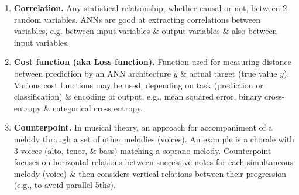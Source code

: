 \documentclass{article}
\begin{document}
\begin{itemize}
\begin{enumerate}
		\item {\bf Correlation.} Any statistical relationship, whether causal or not, between 2 random variables. ANNs are good at extracting correlations between variables, e.g. between input variables \& output variables \& also between input variables.
		\item {\bf Cost function (aka Loss function).} Function used for measuring distance between prediction by an ANN architecture $\hat{y}$ \& actual target (true value $y$). Various cost functions may be used, depending on task (prediction or classification) \& encoding of output, e.g., mean squared error, binary cross-entropy \& categorical cross entropy.
		\item {\bf Counterpoint.} In musical theory, an approach for accompaniment of a melody through a set of other melodies (voices). An example is a chorale with 3 voices (alto, tenor, \& bass) matching a soprano melody. Counterpoint focuses on horizontal relations between successive notes for each simultaneous melody (voice) \& then considers vertical relations between their progression (e.g., to avoid parallel 5ths).
		

\end{enumerate}
\end{itemize}
\end{document}

